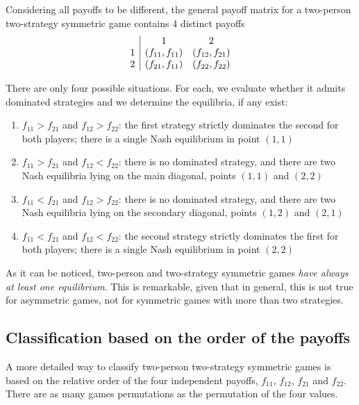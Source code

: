 Considering all payoffs to be different, the general payoff matrix for a two-person two-strategy symmetric game contains 4 distinct payoffs
$$ 
\begin{array}{c | c c}
	& 1 & 2 \\
	1 & (f_{11}, f_{11}) & (f_{12}, f_{21}) \\ 
	2 & (f_{21}, f_{11}) &(f_{22}, f_{22}) \\
\end{array}
$$

There are only four possible situations. For each, we evaluate whether it admits dominated strategies and we determine the equilibria, if any exist: 
\begin{enumerate}
	\item $f_{11} > f_{21}$ and $f_{12} > f_{22}$: the first strategy strictly dominates the second for both players; there is a single Nash equilibrium in point $(1,1)$
	
	\item $f_{11} > f_{21}$ and $f_{12} < f_{22}$: there is no dominated strategy, and there are two Nash equilibria lying on the main diagonal, points $(1,1)$ and $(2,2)$
	
	\item $f_{11} < f_{21}$ and $f_{12} > f_{22}$: there is no dominated strategy, and there are two Nash equilibria lying on the secondary diagonal, points $(1,2)$ and $(2,1)$
	
	\item $f_{11} < f_{21}$ and $f_{12} < f_{22}$: the second strategy strictly dominates the first for both players; there is a single Nash equilibrium in point $(2,2)$
\end{enumerate}

As it can be noticed, two-person and two-strategy symmetric games \textit{have always at least one equilibrium}.  This is remarkable, given that in general, this is not true for asymmetric games, not for symmetric games with more than two strategies. 

\subsection{Classification based on the order of the payoffs}

A more detailed way to classify two-person two-strategy symmetric games is based on the relative order of the four independent payoffs, $f_{11}$, $f_{12}$, $f_{21}$ and $f_{22}$. There are as many games permutations as the permutation of the four values.

